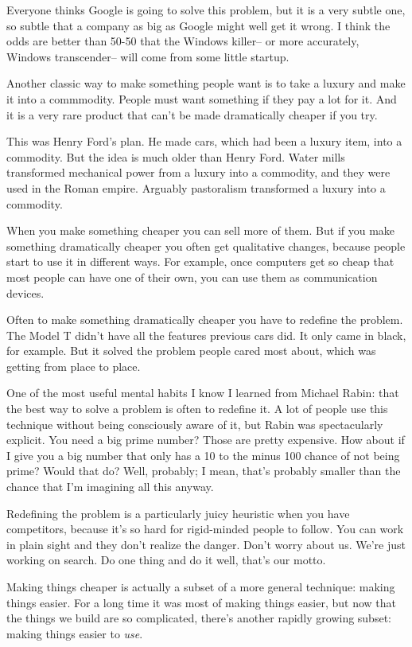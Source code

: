 \documentclass[12pt]{book}
\begin{document}
Everyone thinks Google is going to solve this problem, but it is a very
subtle one, so subtle that a company as big as Google might well get it
wrong. I think the odds are better than 50-50 that the Windows killer--
or more accurately, Windows transcender-- will come from some little
startup.

Another classic way to make something people want is to take a luxury
and make it into a commmodity. People must want something if they pay a
lot for it. And it is a very rare product that can't be made
dramatically cheaper if you try.

This was Henry Ford's plan. He made cars, which had been a luxury item,
into a commodity. But the idea is much older than Henry Ford. Water
mills transformed mechanical power from a luxury into a commodity, and
they were used in the Roman empire. Arguably pastoralism transformed a
luxury into a commodity.

When you make something cheaper you can sell more of them. But if you
make something dramatically cheaper you often get qualitative changes,
because people start to use it in different ways. For example, once
computers get so cheap that most people can have one of their own, you
can use them as communication devices.

Often to make something dramatically cheaper you have to redefine the
problem. The Model T didn't have all the features previous cars did. It
only came in black, for example. But it solved the problem people cared
most about, which was getting from place to place.

One of the most useful mental habits I know I learned from Michael
Rabin: that the best way to solve a problem is often to redefine it. A
lot of people use this technique without being consciously aware of it,
but Rabin was spectacularly explicit. You need a big prime number? Those
are pretty expensive. How about if I give you a big number that only has
a 10 to the minus 100 chance of not being prime? Would that do? Well,
probably; I mean, that's probably smaller than the chance that I'm
imagining all this anyway.

Redefining the problem is a particularly juicy heuristic when you have
competitors, because it's so hard for rigid-minded people to follow. You
can work in plain sight and they don't realize the danger. Don't worry
about us. We're just working on search. Do one thing and do it well,
that's our motto.

Making things cheaper is actually a subset of a more general technique:
making things easier. For a long time it was most of making things
easier, but now that the things we build are so complicated, there's
another rapidly growing subset: making things easier to \emph{use}.
\end{document}
